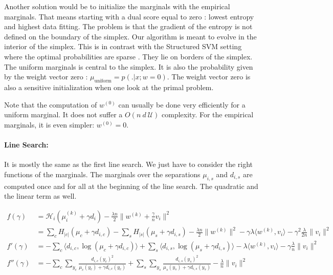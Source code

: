 \documentclass{article}
\DeclareMathOperator{\1}{\mathbb{1}}
\begin{document}
Another solution would be to initialize the marginals with the empirical marginals.
That means starting with a dual score equal to zero : lowest entropy and highest data fitting.
The problem is that the gradient of the entropy is not defined on the boundary of the simplex.
Our algorithm is meant to evolve in the interior of the simplex. 
This is in contrast with the Structured SVM setting where the optimal probabilities are sparse \cite{lacoste-julien_block-coordinate_2012}.
They lie on borders of the simplex.
The uniform marginals is central to the simplex.
It is also the probability given by the weight vector zero : $\mu_{\textrm{uniform}} = p(. |x ; w=0)$.
The weight vector zero is also a sensitive initialization when one look at the primal problem.

Note that the computation of $w^{(0)}$ can usually be done very efficiently for a uniform marginal.
It does not suffer a $O(n\ d\ \mathcal U)$ complexity.
For the empirical marginals, it is even simpler: $w^{(0)}=0$.

\paragraph{Line Search:} 
It is mostly the same as the first line search.
We just have to consider the right functions of the marginals.
The marginals over the separations $\mu_{i, s}$ and $d_{i, s}$ are computed once and for all at the beginning of the line search.
The quadratic and the linear term as well.


\begin{align*}
	f(\gamma)
	& = \mathcal H_i(\mu_i^{(k)} + \gamma d_i) 
	- \frac{\lambda n}{2} \| w^{(k)} + \frac{\gamma}{n} v_i \|^2 
	\\
	& =  \sum_c H_{|c|}(\mu_c + \gamma d_{i, c}) 
	- \sum_s H_{|s|}(\mu_s + \gamma d_{i, s}) 
	- \frac{\lambda n}{2} \| w^{(k)}\|^2 
	- \gamma \lambda  \langle w^{(k)} , v_i \rangle 
	- \gamma^2 \frac{\lambda}{2n} \|v_i \|^2 
	\\
	f'(\gamma) & =  - \sum_c \langle d_{i, c}, \log(\mu_c + \gamma d_{i, c}) \rangle 
	+ \sum_s \langle d_{i, s} , \log(\mu_s + \gamma d_{i, s}) \rangle 
	- \lambda  \langle w^{(k)} , v_i \rangle 
	- \gamma \frac{\lambda}{n} \|v_i \|^2 
	\\
	f''(\gamma) & = - \sum_c \sum_{y_c} \frac{d_{i, c}(y_c)^2 }{ \mu_c(y_c) + \gamma d_{i, c}(y_c) }
	+ \sum_s \sum_{y_s} \frac{d_{i, s}(y_s)^2 }{ \mu_s(y_s) + \gamma d_{i, s}(y_s) }
	- \frac{\lambda}{n} \|v_i \|^2 
\end{align*}
\end{document}
